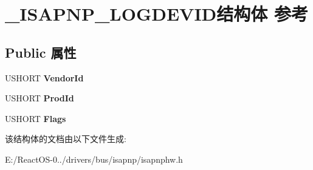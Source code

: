 \hypertarget{struct___i_s_a_p_n_p___l_o_g_d_e_v_i_d}{}\section{\+\_\+\+I\+S\+A\+P\+N\+P\+\_\+\+L\+O\+G\+D\+E\+V\+I\+D结构体 参考}
\label{struct___i_s_a_p_n_p___l_o_g_d_e_v_i_d}
\subsection*{Public 属性}
\begin{DoxyCompactItemize}
\item 
\mbox{\label{struct___i_s_a_p_n_p___l_o_g_d_e_v_i_d_a0342861b061e73ed3c5dcfe007e2e8e4}} 
U\+S\+H\+O\+RT {\bfseries Vendor\+Id}
\item 
\mbox{\label{struct___i_s_a_p_n_p___l_o_g_d_e_v_i_d_a1783798ff573cb85cef266973eb9f268}} 
U\+S\+H\+O\+RT {\bfseries Prod\+Id}
\item 
\mbox{\label{struct___i_s_a_p_n_p___l_o_g_d_e_v_i_d_a5d5bfd0ac10d701be4fe2a0076ddd964}} 
U\+S\+H\+O\+RT {\bfseries Flags}
\end{DoxyCompactItemize}


该结构体的文档由以下文件生成\+:\begin{DoxyCompactItemize}
\item 
E\+:/\+React\+O\+S-\/0../drivers/bus/isapnp/isapnphw.\+h\end{DoxyCompactItemize}
